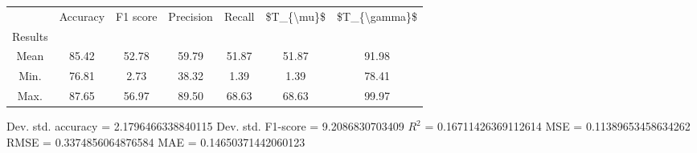 \begin{tabular}{|c|c|c|c|c|c|c|}
\toprule
{} &  Accuracy &  F1 score &  Precision &  Recall &  \$T\_\{\textbackslash mu\}\$ &  \$T\_\{\textbackslash gamma\}\$ \\
Results &           &           &            &         &            &               \\
\hline
Mean    &     85.42 &     52.78 &      59.79 &   51.87 &      51.87 &         91.98 \\
Min.    &     76.81 &      2.73 &      38.32 &    1.39 &       1.39 &         78.41 \\
Max.    &     87.65 &     56.97 &      89.50 &   68.63 &      68.63 &         99.97 \\
\bottomrule
\end{tabular}

 Dev. std. accuracy = 2.1796466338840115
 Dev. std. F1-score = 9.2086830703409
 $R^2$ = 0.16711426369112614
 MSE = 0.11389653458634262
 RMSE = 0.3374856064876584
 MAE = 0.14650371442060123